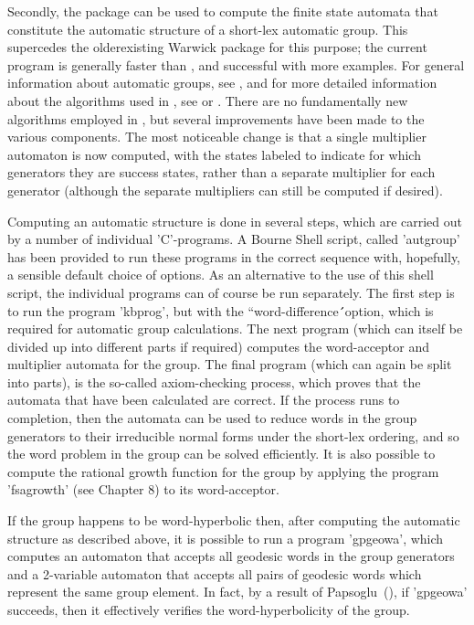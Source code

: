 Secondly, the package can be used to compute the finite state automata
that constitute the automatic structure of a short-lex automatic group.
This supercedes the olderexisting Warwick {\Automata} package for this purpose;
the current program is generally faster than {\Automata}, and successful with
more examples. For general information about automatic groups, see
\cite{ECHLPT92}, and for more detailed information about the algorithms
used in {\Automata}, see \cite{EHR91} or \cite{Holt94}. There are 
no fundamentally new algorithms employed in {\KBMAG}, but several
improvements have been made to the various components. The most
noticeable change is that a single multiplier automaton is now computed,
with the states labeled to indicate for which generators they are success
states, rather than a separate multiplier for each generator (although the
separate multipliers can still be computed if desired).

Computing an automatic structure is done in several steps, which are
carried out by a number of individual 'C'-programs. A Bourne Shell script,
called 'autgroup' has been provided to run these programs in the correct
sequence with, hopefully, a sensible default choice of options. As an
alternative to the use of this shell script, the individual programs can of
course be run separately. The first step is to run the program
'kbprog', but with the ``word-difference\'\'\ option, which is required
for automatic group calculations. The next program (which can itself be
divided up into different parts if required) computes the word-acceptor
and multiplier automata for the group. The final program (which can again
be split into parts), is the so-called axiom-checking process, which proves
that the automata that have been calculated are correct.
If the process runs to completion, then the automata can be used to reduce
words in the group generators to their irreducible normal forms under the
short-lex ordering, and so the word problem in the group can be solved
efficiently. It is also possible to compute the rational growth function
for the group by applying the program 'fsagrowth' (see Chapter 8) to its
word-acceptor.

If the group happens to be word-hyperbolic then,
after computing the automatic structure as described above, it is
possible to run a program 'gpgeowa', which computes an automaton that accepts
all geodesic words in the group generators and a 2-variable automaton that
accepts all pairs of geodesic words which represent the same group element.
In fact, by a result of Papsoglu~(\cite{PAP}), if 'gpgeowa'
succeeds, then it effectively verifies the word-hyperbolicity of the
group.
 
